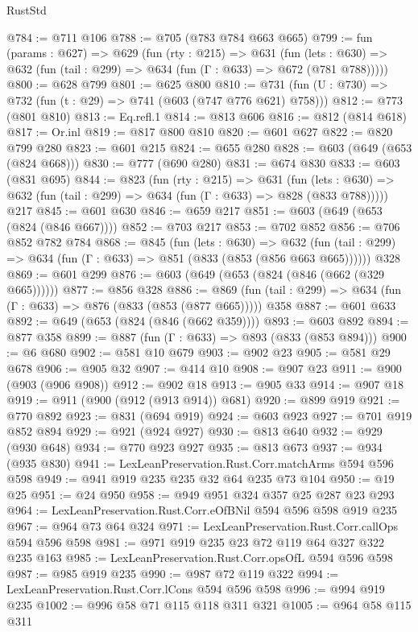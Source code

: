 \begin{lexlean}{RustStd}
\begin{coremodule}
@784 := @711 @106
@788 := @705 (@783 @784 @663 @665)
@799 := fun (params : @627) =>
  @629
    (fun (rty : @215) =>
    @631
      (fun (lets : @630) => @632 (fun (tail : @299) => @634 (fun (Γ : @633) => @672 (@781 @788)))))
@800 := @628 @799
@801 := @625 @800
@810 := @731 (fun (U : @730) => @732 (fun (t : @29) => @741 (@603 (@747 @776 @621) @758)))
@812 := @773 (@801 @810)
@813 := Eq.refl.{1}
@814 := @813 @606
@816 := @812 (@814 @618)
@817 := Or.inl
@819 := @817 @800 @810
@820 := @601 @627
@822 := @820 @799 @280
@823 := @601 @215
@824 := @655 @280
@828 := @603 (@649 (@653 (@824 @668)))
@830 := @777 (@690 @280)
@831 := @674 @830
@833 := @603 (@831 @695)
@844 := @823
    (fun (rty : @215) =>
    @631
      (fun (lets : @630) => @632 (fun (tail : @299) => @634 (fun (Γ : @633) => @828 (@833 @788)))))
    @217
@845 := @601 @630
@846 := @659 @217
@851 := @603 (@649 (@653 (@824 (@846 @667))))
@852 := @703 @217
@853 := @702 @852
@856 := @706 @852 @782 @784
@868 := @845
    (fun (lets : @630) =>
    @632 (fun (tail : @299) => @634 (fun (Γ : @633) => @851 (@833 (@853 (@856 @663 @665))))))
    @328
@869 := @601 @299
@876 := @603 (@649 (@653 (@824 (@846 (@662 (@329 @665))))))
@877 := @856 @328
@886 := @869 (fun (tail : @299) => @634 (fun (Γ : @633) => @876 (@833 (@853 (@877 @665))))) @358
@887 := @601 @633
@892 := @649 (@653 (@824 (@846 (@662 @359))))
@893 := @603 @892
@894 := @877 @358
@899 := @887 (fun (Γ : @633) => @893 (@833 (@853 @894)))
@900 := @6 @680
@902 := @581 @10 @679
@903 := @902 @23
@905 := @581 @29 @678
@906 := @905 @32
@907 := @414 @10
@908 := @907 @23
@911 := @900 (@903 (@906 @908))
@912 := @902 @18
@913 := @905 @33
@914 := @907 @18
@919 := @911 (@900 (@912 (@913 @914)) @681)
@920 := @899 @919
@921 := @770 @892
@923 := @831 (@694 @919)
@924 := @603 @923
@927 := @701 @919 @852 @894
@929 := @921 (@924 @927)
@930 := @813 @640
@932 := @929 (@930 @648)
@934 := @770 @923 @927
@935 := @813 @673
@937 := @934 (@935 @830)
@941 := LexLeanPreservation.Rust.Corr.matchArms @594 @596 @598
@949 := @941 @919 @235 @235 @32 @64 @235 @73 @104
@950 := @19 @25
@951 := @24 @950
@958 := @949 @951 @324 @357 @25 @287 @23 @293
@964 := LexLeanPreservation.Rust.Corr.eOfBNil @594 @596 @598 @919 @235
@967 := @964 @73 @64 @324
@971 := LexLeanPreservation.Rust.Corr.callOps @594 @596 @598
@981 := @971 @919 @235 @23 @72 @119 @64 @327 @322 @235 @163
@985 := LexLeanPreservation.Rust.Corr.opsOfL @594 @596 @598
@987 := @985 @919 @235
@990 := @987 @72 @119 @322
@994 := LexLeanPreservation.Rust.Corr.lCons @594 @596 @598
@996 := @994 @919 @235
@1002 := @996 @58 @71 @115 @118 @311 @321
@1005 := @964 @58 @115 @311

\end{coremodule}
\end{lexlean}
